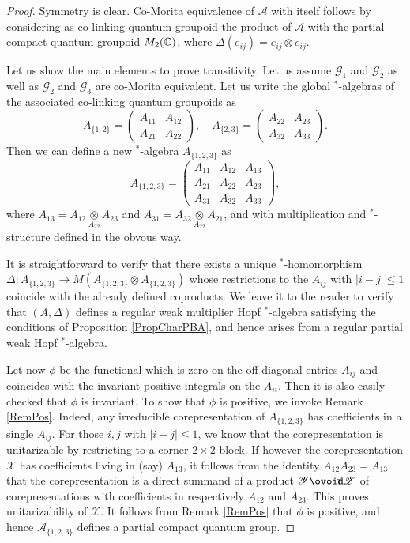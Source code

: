 \begin{proof} Symmetry is clear. Co-Morita equivalence of $\mathscr{A}$ with itself follows by considering as co-linking quantum groupoid the product of $\mathscr{A}$ with the partial compact quantum groupoid $M_2(\mathbb{C})$, where $\Delta(e_{ij}) = e_{ij}\otimes e_{ij}$. 

Let us show the main elements to prove transitivity. Let us assume $\mathscr{G}_1$ and $\mathscr{G}_2$ as well as $\mathscr{G}_2$ and $\mathscr{G}_3$ are co-Morita equivalent. Let us write the global $^*$-algebras of the associated co-linking quantum groupoids as \[A_{\{1,2\}} = \begin{pmatrix} A_{11} & A_{12} \\ A_{21} & A_{22} \end{pmatrix}, \quad A_{\{2,3\}} = \begin{pmatrix} A_{22} & A_{23} \\ A_{32} & A_{33}\end{pmatrix}.\] Then we can define a new $^*$-algebra $A_{\{1,2,3\}}$ as \[ A_{\{1,2,3\}} = \begin{pmatrix} A_{11} & A_{12} &   A_{13} \\ A_{21} & A_{22} & A_{23} \\ A_{31} & A_{32} & A_{33} \end{pmatrix},\] where $A_{13} = A_{12}\underset{A_{22}}{\otimes } A_{23}$ and $A_{31} = A_{32}\underset{A_{22}}{\otimes} A_{21}$, and with multiplication and $^*$-structure defined in the obvous way. 

It is straightforward to verify that there exists a unique $^*$-homomorphism $\Delta: A_{\{1,2,3\}} \rightarrow M(A_{\{1,2,3\}}\otimes A_{\{1,2,3\}})$ whose restrictions to the $A_{ij}$ with $|i-j|\leq 1$ coincide with the already defined coproducts. We leave it to the reader to verify that $(A,\Delta)$ defines a regular weak multiplier Hopf $^*$-algebra satisfying the conditions of Proposition \ref{PropCharPBA}, and hence arises from a regular partial weak Hopf $^*$-algebra. 

Let now $\phi$ be the functional which is zero on the off-diagonal entries $A_{ij}$ and coincides with the invariant positive integrals on the $A_{ii}$. Then it is also easily checked that $\phi$ is invariant. To show that $\phi$ is positive, we invoke Remark \ref{RemPos}. Indeed, any irreducible corepresentation of $A_{\{1,2,3\}}$ has coefficients in a single $A_{ij}$. For those $i,j$ with $|i-j|\leq 1$, we know that the corepresentation is unitarizable by restricting to a corner $2\times 2$-block. If however the corepresentation $\mathscr{X}$ has coefficients living in (say) $A_{13}$, it follows from the identity $A_{12}A_{23}=A_{13}$ that the corepresentation is a direct summand of a product $\mathscr{Y}\Circt \mathscr{Z}$ of corepresentations with coefficients in respectively $A_{12}$ and $A_{23}$. This proves unitarizability of $\mathscr{X}$. It follows from Remark \ref{RemPos} that $\phi$ is positive, and hence $\mathscr{A}_{\{1,2,3\}}$ defines a partial compact quantum group.  


\end{proof}

